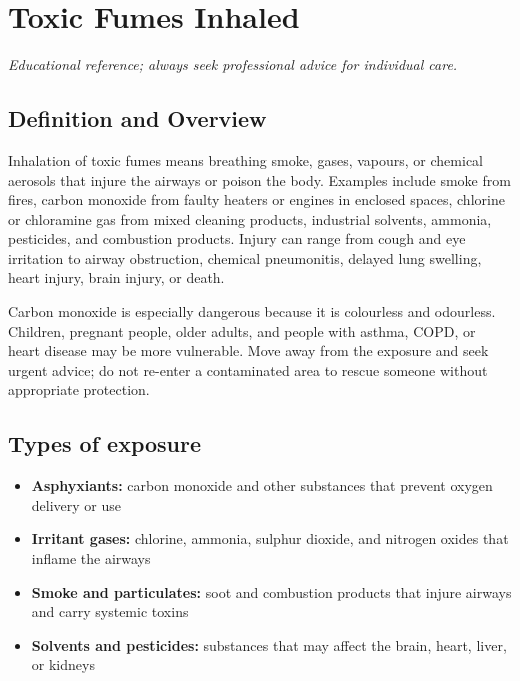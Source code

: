 \chapter{Toxic Fumes Inhaled}
\medskip
\noindent\textit{Educational reference; always seek professional advice for individual care.}

\section*{Definition and Overview}
Inhalation of toxic fumes means breathing smoke, gases, vapours, or chemical aerosols that injure the airways or poison the body. Examples include smoke from fires, carbon monoxide from faulty heaters or engines in enclosed spaces, chlorine or chloramine gas from mixed cleaning products, industrial solvents, ammonia, pesticides, and combustion products. Injury can range from cough and eye irritation to airway obstruction, chemical pneumonitis, delayed lung swelling, heart injury, brain injury, or death.

Carbon monoxide is especially dangerous because it is colourless and odourless. Children, pregnant people, older adults, and people with asthma, COPD, or heart disease may be more vulnerable. Move away from the exposure and seek urgent advice; do not re-enter a contaminated area to rescue someone without appropriate protection.

\section*{Types of exposure}
\begin{itemize}
    \item \textbf{Asphyxiants:} carbon monoxide and other substances that prevent oxygen delivery or use
    \item \textbf{Irritant gases:} chlorine, ammonia, sulphur dioxide, and nitrogen oxides that inflame the airways
    \item \textbf{Smoke and particulates:} soot and combustion products that injure airways and carry systemic toxins
    \item \textbf{Solvents and pesticides:} substances that may affect the brain, heart, liver, or kidneys
\end{itemize}

